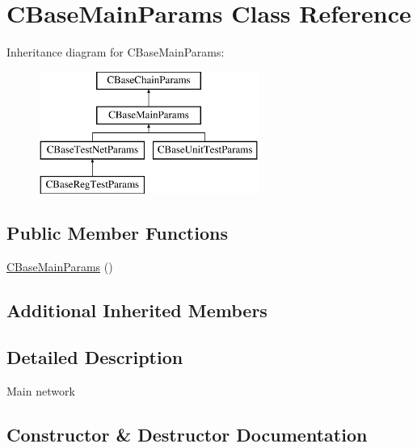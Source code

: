 \hypertarget{class_c_base_main_params}{}\section{C\+Base\+Main\+Params Class Reference}
\label{class_c_base_main_params}
Inheritance diagram for C\+Base\+Main\+Params\+:\begin{figure}[H]
\begin{center}
\leavevmode
\includegraphics[height=4.000000cm]{class_c_base_main_params}
\end{center}
\end{figure}
\subsection*{Public Member Functions}
\begin{DoxyCompactItemize}
\item 
\mbox{\hyperlink{class_c_base_main_params_a547dabd3f634a23b8cd5478242e101e1}{C\+Base\+Main\+Params}} ()
\end{DoxyCompactItemize}
\subsection*{Additional Inherited Members}


\subsection{Detailed Description}
Main network 

\subsection{Constructor \& Destructor Documentation}
\mbox{\label{class_c_base_main_params_a547dabd3f634a23b8cd5478242e101e1}} 
